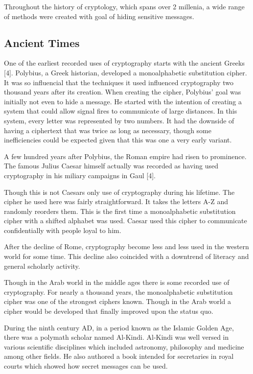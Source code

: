 \documentclass{article}
\begin{document}
    Throughout the history of cryptology, which spans over 2 millenia,
    a wide range of methods were created with goal of hiding sensitive
    messages.

    \subsection{Ancient Times}

    One of the earliest recorded uses of cryptography starts with the ancient Greeks [4].
    Polybius, a Greek historian, developed a monoalphabetic substitution cipher. It
    was so influencial that the techniques it used influenced cryptography two thousand
    years after its creation.
    When creating the cipher, Polybius' goal was initially not even to hide a message.
    He started with the intention of creating a system that could allow signal fires
    to communicate of large distances. In this system, every letter was represented
    by two numbers. It had the downside of having a ciphertext that was twice as long
    as necessary, though some inefficiencies could be expected given that this
    was one a very early variant.

    A few hundred years after Polybius, the Roman empire had risen to prominence.
    The famous Julius Caesar himself actually was recorded as having used cryptography
    in his miliary campaigns in Gaul [4].

    Though this is not Caesars only use of cryptography during his lifetime.
    The cipher he used here was fairly straightforward. It takes the letters A-Z
    and randomly reorders them. This is the first time a monoalphabetic substitution
    cipher with a shifted alphabet was used.
    Caesar used this cipher to communicate confidentially with people loyal to him.

    After the decline of Rome, cryptography become less and less used in the western
    world for some time.
    This decline also coincided with a downtrend of literacy and general scholarly activity.

    Though in the Arab world in the middle ages there is some recorded use of cryptography.
    For nearly a thousand years, the monoalphabetic substitution cipher was one
    of the strongest ciphers known. Though in the Arab world a cipher would be developed
    that finally improved upon the status quo.

    During the ninth century AD, in a period known as the Islamic Golden Age,
    there was a polymath scholar named Al-Kindi. Al-Kindi was
    well versed in various scientific disciplines which included astronomy, philosophy
    and medicine among other fields. He also authored a book intended for
    secretaries in royal courts which showed how secret messages can be used.
\end{document}
